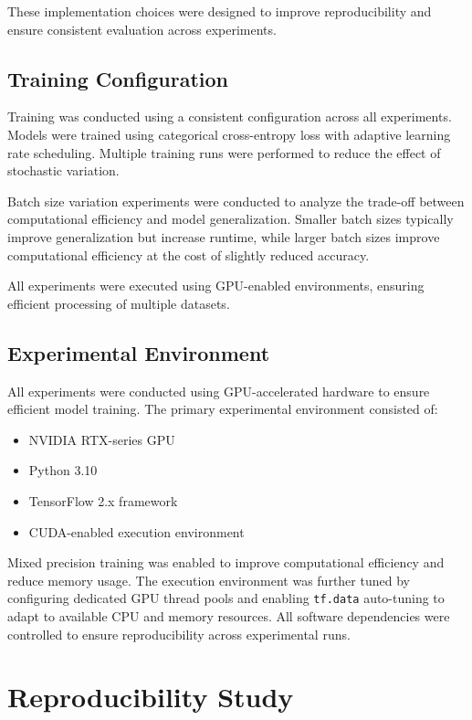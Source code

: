 \documentclass[conference]{IEEEtran}
\begin{document}
These implementation choices were designed to improve reproducibility and ensure consistent evaluation across experiments.

\subsection{Training Configuration}

Training was conducted using a consistent configuration across all experiments. Models were trained using categorical cross-entropy loss with adaptive learning rate scheduling. Multiple training runs were performed to reduce the effect of stochastic variation.

Batch size variation experiments were conducted to analyze the trade-off between computational efficiency and model generalization. Smaller batch sizes typically improve generalization but increase runtime, while larger batch sizes improve computational efficiency at the cost of slightly reduced accuracy.

All experiments were executed using GPU-enabled environments, ensuring efficient processing of multiple datasets.

\subsection{Experimental Environment}

All experiments were conducted using GPU-accelerated hardware to ensure efficient model training. The primary experimental environment consisted of:

\begin{itemize}
    \item NVIDIA RTX-series GPU
    \item Python 3.10
    \item TensorFlow 2.x framework
    \item CUDA-enabled execution environment
\end{itemize}

Mixed precision training was enabled to improve computational efficiency and reduce memory usage. The execution environment was further tuned by configuring dedicated GPU thread pools and enabling \texttt{tf.data} auto-tuning to adapt to available CPU and memory resources. All software dependencies were controlled to ensure reproducibility across experimental runs.


\section{Reproducibility Study}
\end{document}
